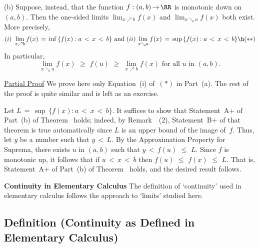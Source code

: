 \V

        (b) Suppose, instead, that the function $f:(a,b) \,{\rightarrow}\, {\RR}$ is monotonic down on $(a,b)$.
    Then the one-sided limits $\lim_{x{\nearrow}b} f(x)$ and $\lim_{x{\searrow}a} f(x)$ both exist.
    More precisely,
        \begin{displaymath}
        (i)\,\,\lim_{x{\nearrow}b} f(x) \,=\, {\inf}\,\{f(x): a\,<\,x\,<\,b\}
    \mbox{ and }
        (ii)\,\lim_{x{\searrow}a} f(x) \,=\, {\sup}\,\{f(x): a\,<\,x\,<\,b\} \h
        ({\ast}{\ast})
        \end{displaymath}
    In particular, 
        \begin{displaymath}
        \lim_{x{\searrow}a} f(x)\,\,{\geq}\,\,f(u)\,\,{\geq}\,\,\lim_{x{\nearrow}b} f(x) \mbox{ for all $u$ in $(a,b)$}.
        \end{displaymath}

    

\V

        \underline{Partial Proof} We prove here only Equation~(i) of~$({\ast})$ in Part~(a). The rest of the proof is quite similar and is left as an exercise.

\V

        Let $L \,=\, {\sup}\,\{f(x): a\,<\,x\,<\,b\}$. It suffices to show that Statement~A+ of Part~(b) of Theorem~ holds;
    indeed, by Remark~~(2), Statement~B+ of that theorem is true automatically since $L$ is an upper bound of the image of~$f$.
    Thus, let $y$ be a number such that $y\,<\,L$. By the Approximation Property for Suprema, there exists $u$ in $(a,b)$ such that $y\,<\,f(u)\,\,{\leq}\,\,L$.
    Since $f$ is monotonic up, it follows that if $u\,<\,x\,<\,b$ then $f(u)\,\,{\leq}\,\,f(x)\,\,{\leq}\,\,L$.
    That is, Statement~A+ of Part~(b) of Theorem~ holds, and the desired result follows.

\VV

        {\bf Continuity in Elementary Calculus} The definition of `continuity' used in elementary calculus follows the approach to `limits' studied here.
    
\V

            \subsection{\small{\bf Definition} (Continuity as Defined in Elementary Calculus)}
            \label{DefD50.50}

